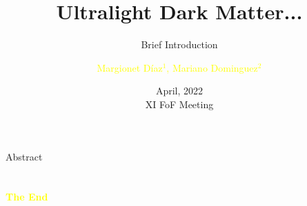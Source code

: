 \documentclass[aspectratio=43]{beamer}
\title{Ultralight Dark Matter...} %
\subtitle{Brief Introduction}
\author[F.de Tal]{\textcolor{yellow}{Margionet Díaz$^1$, Mariano Dominguez$^2$}}
\institute[IMUFSP]{
    \textcolor{white}{$^1$Facultad de Ciencias, ULA. \\ $^2$IATE-OAC-CONICET}%
    \\%
    \textcolor{white}{}%
} %
\date{April, 2022 \\
XI FoF Meeting}
\begin{document}
    
    \frame{\titlepage}
    
    \begin{frame}{Abstract}
        \tableofcontents
    \end{frame}
    
    
    
    
    
     
    
    
    
    

    \section{}
    \begin{frame}{}
        \centering
            \Huge\bfseries
        \textcolor{yellow}{The End}
    \end{frame}
\end{document}
